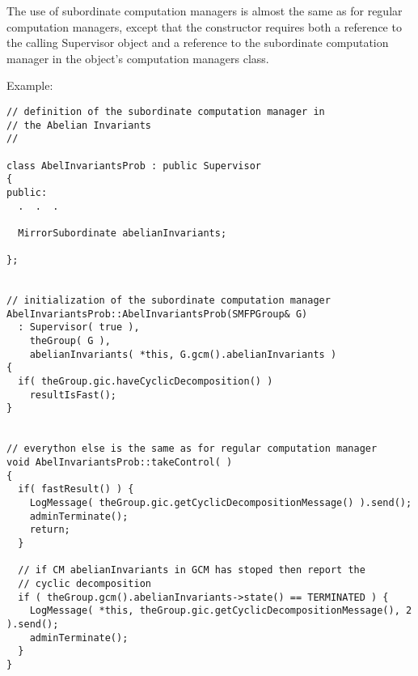 \documentclass[12pt]{article}
\begin{document}
The use of subordinate computation managers is almost the same as for
regular
computation managers, except that the constructor requires both a
reference
to the calling Supervisor object and a reference to the subordinate 
computation manager in the object's computation managers class.

Example:
\footnotesize
\begin{verbatim}
// definition of the subordinate computation manager in 
// the Abelian Invariants
//

class AbelInvariantsProb : public Supervisor
{
public:
  .  .  .

  MirrorSubordinate abelianInvariants;

};


// initialization of the subordinate computation manager
AbelInvariantsProb::AbelInvariantsProb(SMFPGroup& G)
  : Supervisor( true ),
	theGroup( G ),
 	abelianInvariants( *this, G.gcm().abelianInvariants )
{
  if( theGroup.gic.haveCyclicDecomposition() )
    resultIsFast();
}


// everython else is the same as for regular computation manager
void AbelInvariantsProb::takeControl( )
{
  if( fastResult() ) {
    LogMessage( theGroup.gic.getCyclicDecompositionMessage() ).send();
    adminTerminate();
    return;
  }

  // if CM abelianInvariants in GCM has stoped then report the
  // cyclic decomposition
  if ( theGroup.gcm().abelianInvariants->state() == TERMINATED ) {
    LogMessage( *this, theGroup.gic.getCyclicDecompositionMessage(), 2
).send();
    adminTerminate();
  }
}

\end{verbatim}
\normalsize
\end{document}
